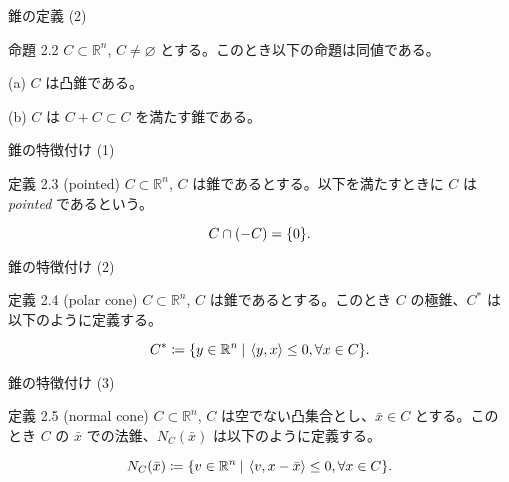 \documentclass[aspectratio=169, dvipdfmx, 11pt]{beamer} %
\begin{document}
\begin{frame}{錐の定義 (2) }
  \begin{block}{命題 2.2}
    $C \subset \mathbb{R}^n$, $C \neq \varnothing$ とする。このとき以下の命題は同値である。

    (a) $C$ は凸錐である。

    (b) $C$ は $C + C \subset C$ を満たす錐である。

  \end{block}
\end{frame}

\begin{frame}{錐の特徴付け (1)}
  \begin{block}{定義 2.3 (pointed) }
    $C \subset \mathbb{R}^n$, $C$ は錐であるとする。以下を満たすときに $C$ は \textit{pointed} であるという。

    \begin{equation}
      C \cap  (-C) = \{0\}. \notag
    \end{equation}

  \end{block}
\end{frame}

\begin{frame}{錐の特徴付け (2)}
  \begin{block}{定義 2.4 (polar cone) }
    $C \subset \mathbb{R}^n$, $C$ は錐であるとする。このとき $C$ の極錐、$C^*$ は以下のように定義する。

    \begin{equation}
      C^* \coloneqq \{y \in \mathbb{R}^n \:|\: \left\langle y,x \right\rangle \leq 0 , \forall x \in C \}. \notag
    \end{equation}

  \end{block}
\end{frame}

\begin{frame}{錐の特徴付け (3)}
  \begin{block}{定義 2.5 (normal cone) }
    $C \subset \mathbb{R}^n$, $C$ は空でない凸集合とし、$\bar{x} \in C$ とする。このとき $C$ の $\bar{x}$ での法錐、$N_C(\bar{x})$ は以下のように定義する。

    \begin{equation}
      N_C(\bar{x}) \coloneqq \{ v \in \mathbb{R}^n \:|\: \left\langle v, x - \bar{x} \right\rangle \leq 0, \forall x \in C \}. \notag
    \end{equation}

  \end{block}
\end{frame}
\end{document}
